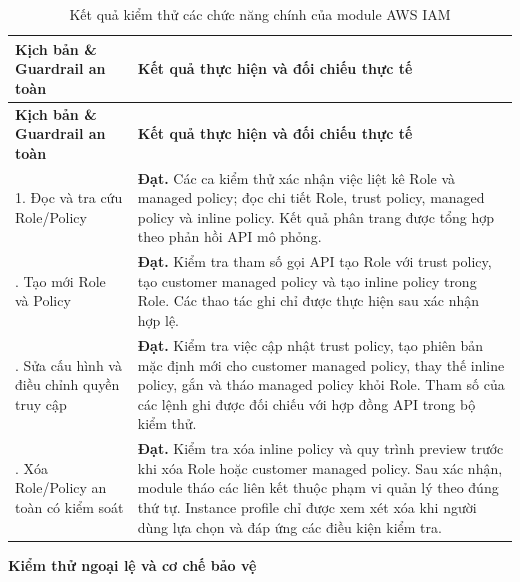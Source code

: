 \documentclass[a4paper,12pt]{article}
\begin{document}
\begingroup
\setlength{\tabcolsep}{6pt}
\renewcommand{\arraystretch}{1.15}
\fontsize{10.5}{14}\selectfont
\begin{longtable}{@{}
  >{\raggedright\arraybackslash}p{4.8cm}
  >{\raggedright\arraybackslash}p{\dimexpr\linewidth-4.8cm-2\tabcolsep\relax}@{}}
\caption{Kết quả kiểm thử các chức năng chính của module AWS IAM}
\label{tab:iam_functional_tests}\\
\toprule
\textbf{Kịch bản \& Guardrail an toàn} &
\textbf{Kết quả thực hiện và đối chiếu thực tế}\\
\midrule
\endfirsthead
\toprule
\textbf{Kịch bản \& Guardrail an toàn} &
\textbf{Kết quả thực hiện và đối chiếu thực tế}\\
\midrule
\endhead
\endfoot
\bottomrule
\endlastfoot

1. Đọc và tra cứu Role/Policy &
\textbf{Đạt.} Các ca kiểm thử xác nhận việc liệt kê Role và managed policy;
đọc chi tiết Role, trust policy, managed policy và inline policy.
Kết quả phân trang được tổng hợp theo phản hồi API mô phỏng.\\

2. Tạo mới Role và Policy &
\textbf{Đạt.} Kiểm tra tham số gọi API tạo Role với trust policy,
tạo customer managed policy và tạo inline policy trong Role.
Các thao tác ghi chỉ được thực hiện sau xác nhận hợp lệ.\\

3. Sửa cấu hình và điều chỉnh quyền truy cập &
\textbf{Đạt.} Kiểm tra việc cập nhật trust policy, tạo phiên bản
mặc định mới cho customer managed policy, thay thế inline policy,
gắn và tháo managed policy khỏi Role. Tham số của các lệnh ghi
được đối chiếu với hợp đồng API trong bộ kiểm thử.\\

4. Xóa Role/Policy an toàn có kiểm soát &
\textbf{Đạt.} Kiểm tra xóa inline policy và quy trình preview trước
khi xóa Role hoặc customer managed policy. Sau xác nhận, module
tháo các liên kết thuộc phạm vi quản lý theo đúng thứ tự.
Instance profile chỉ được xem xét xóa khi người dùng lựa chọn
và đáp ứng các điều kiện kiểm tra.\\

\end{longtable}
\endgroup

\noindent\textbf{Kiểm thử ngoại lệ và cơ chế bảo vệ}
\end{document}
